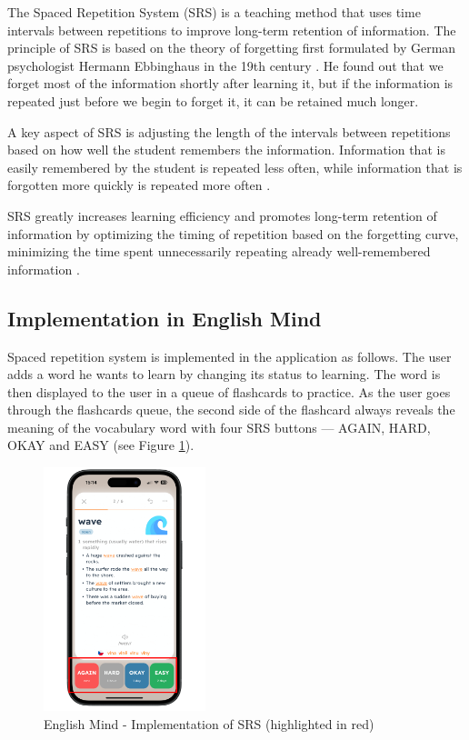The Spaced Repetition System (SRS) is a teaching method that uses time intervals between repetitions to improve long-term retention of information. The principle of SRS is based on the theory of forgetting first formulated by German psychologist Hermann Ebbinghaus in the 19th century \cite{cite:ebbinghaus2013_memory_contribution_to_experimantal_psychology}. He found out that we forget most of the information shortly after learning it, but if the information is repeated just before we begin to forget it, it can be retained much longer.

A key aspect of SRS is adjusting the length of the intervals between repetitions based on how well the student remembers the information. Information that is easily remembered by the student is repeated less often, while information that is forgotten more quickly is repeated more often \cite{cite:kang2016_spaced_repetiton_promotes_efficient_learning}.

SRS greatly increases learning efficiency and promotes long-term retention of information by optimizing the timing of repetition based on the forgetting curve, minimizing the time spent unnecessarily repeating already well-remembered information \cite{cite:kang2016_spaced_repetiton_promotes_efficient_learning}.

\subsection{Implementation in English Mind}

Spaced repetition system is implemented in the application as follows. The user adds a word he wants to learn by changing its status to learning. The word is then displayed to the user in a queue of flashcards to practice. As the user goes through the flashcards queue, the second side of the flashcard always reveals the meaning of the vocabulary word with four SRS buttons — AGAIN, HARD, OKAY and EASY (see Figure \ref{fig:em-srs-flashcard}).

\begin{figure}[!h]
    \includegraphics[width=0.42\textwidth]{src/figures/em-srs-flashcard.png}
    \caption{English Mind - Implementation of SRS (highlighted in red)}
    \label{fig:em-srs-flashcard}
\end{figure}

